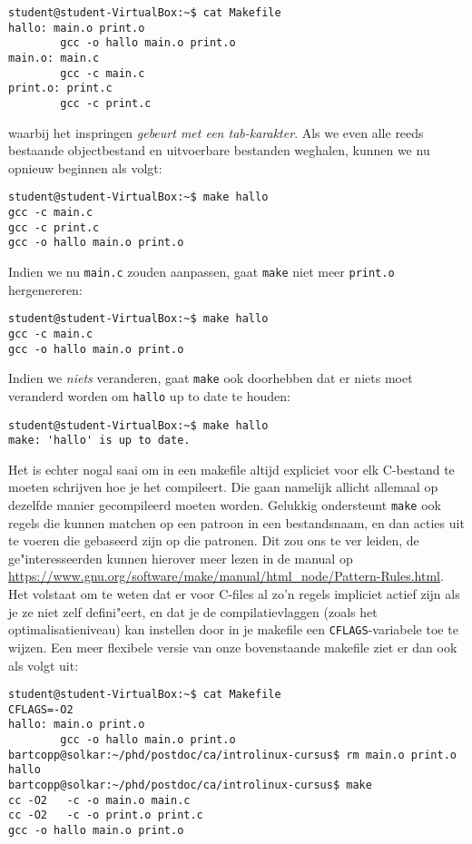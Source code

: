 \documentclass[a4paper,twoside,openany]{memoir}
\begin{document}
\begin{verbatim}
student@student-VirtualBox:~$ cat Makefile
hallo: main.o print.o
        gcc -o hallo main.o print.o
main.o: main.c
        gcc -c main.c
print.o: print.c
        gcc -c print.c
\end{verbatim}
waarbij het inspringen \emph{gebeurt met een tab-karakter}. Als we even alle
reeds bestaande objectbestand en uitvoerbare bestanden weghalen, kunnen we nu
opnieuw beginnen als volgt:

\begin{verbatim}
student@student-VirtualBox:~$ make hallo
gcc -c main.c
gcc -c print.c
gcc -o hallo main.o print.o
\end{verbatim}

Indien we nu \verb!main.c! zouden aanpassen, gaat \verb!make! niet meer
\verb!print.o! hergenereren:

\begin{verbatim}
student@student-VirtualBox:~$ make hallo 
gcc -c main.c
gcc -o hallo main.o print.o
\end{verbatim}

Indien we \emph{niets} veranderen, gaat  \verb!make! ook doorhebben dat er niets
moet veranderd worden om \verb!hallo! up to date te houden:
\begin{verbatim}
student@student-VirtualBox:~$ make hallo 
make: 'hallo' is up to date.
\end{verbatim}

Het is echter nogal saai om in een makefile altijd expliciet voor elk C-bestand
te moeten schrijven hoe je het compileert. Die gaan namelijk allicht allemaal op
dezelfde manier gecompileerd moeten worden. Gelukkig ondersteunt \verb!make! ook
regels die kunnen matchen op een patroon in een bestandsnaam, en dan acties uit
te voeren die gebaseerd zijn op die patronen. Dit zou ons te ver leiden, de
ge"interesseerden kunnen hierover meer lezen in de manual op
\url{https://www.gnu.org/software/make/manual/html_node/Pattern-Rules.html}. Het
volstaat om te weten dat er voor C-files al zo'n regels impliciet actief zijn
als je ze niet zelf defini"eert, en dat je de compilatievlaggen (zoals het
optimalisatieniveau) kan instellen door in je makefile een
\verb!CFLAGS!-variabele toe te wijzen. Een meer flexibele versie van onze
bovenstaande makefile ziet er dan ook als volgt uit:

\begin{verbatim}
student@student-VirtualBox:~$ cat Makefile 
CFLAGS=-O2
hallo: main.o print.o
        gcc -o hallo main.o print.o
bartcopp@solkar:~/phd/postdoc/ca/introlinux-cursus$ rm main.o print.o hallo 
bartcopp@solkar:~/phd/postdoc/ca/introlinux-cursus$ make
cc -O2   -c -o main.o main.c
cc -O2   -c -o print.o print.c
gcc -o hallo main.o print.o
\end{verbatim}
\end{document}
